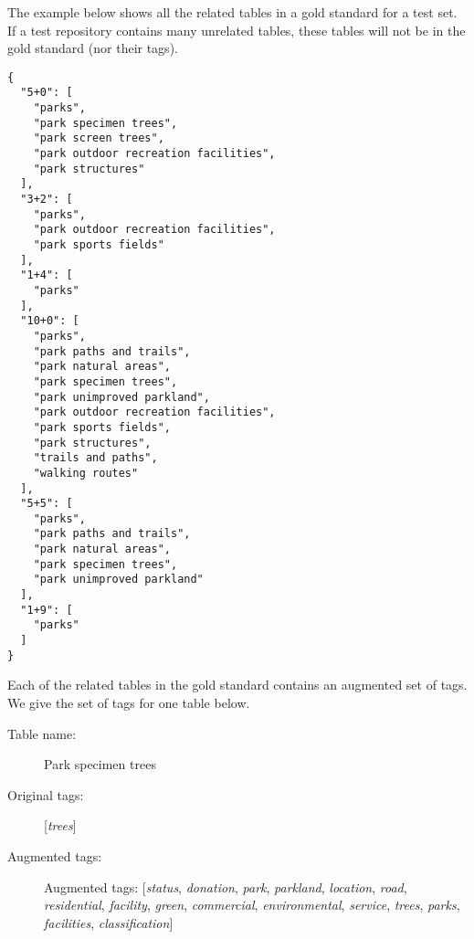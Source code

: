 The example below shows all the related tables in a gold standard for a test set. If a test repository contains many unrelated tables, these tables will not be in the gold standard (nor their tags).
\begin{lstlisting}
{
  "5+0": [
    "parks",
    "park specimen trees",
    "park screen trees",
    "park outdoor recreation facilities",
    "park structures"
  ],
  "3+2": [
    "parks",
    "park outdoor recreation facilities",
    "park sports fields"
  ],
  "1+4": [
    "parks"
  ],
  "10+0": [
    "parks",
    "park paths and trails",
    "park natural areas",
    "park specimen trees",
    "park unimproved parkland",
    "park outdoor recreation facilities",
    "park sports fields",
    "park structures",
    "trails and paths",
    "walking routes"
  ],
  "5+5": [
    "parks",
    "park paths and trails",
    "park natural areas",
    "park specimen trees",
    "park unimproved parkland"
  ],
  "1+9": [
    "parks"
  ]
}
\end{lstlisting}

Each of the related tables in the gold standard contains an augmented set of tags. We give the set of tags for one table below.

\begin{description}
\item[Table name:]Park specimen trees
\item[Original tags:][\textit{trees}]
\item[Augmented tags:]Augmented tags: [\textit{status}, \textit{donation}, \textit{park}, \textit{parkland}, \textit{location}, \textit{road}, \textit{residential}, \textit{facility}, \textit{green}, \textit{commercial}, \textit{environmental}, \textit{service}, \textit{trees}, \textit{parks}, \textit{facilities}, \textit{classification}]
\end{description}
\endinput